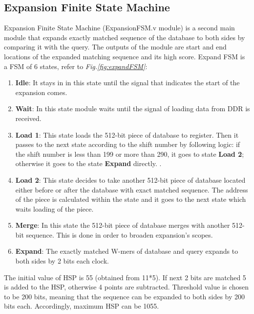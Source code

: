 \subsection{Expansion Finite State Machine}
\quad Expansion Finite State Machine (ExpansionFSM.v module) is a second main module that expands exactly matched sequence of the database to both sides by comparing it with the query. The outputs of the module are start and end locations of the expanded matching sequence and its high score. Expand FSM is a FSM of 6 states, refer to \textit{Fig.\ref{fig:expandFSM}}:

\begin{enumerate}
  \item \textbf{Idle}: It stays in in this state until the signal that indicates the start of the expansion comes.
  \item \textbf{Wait}: In this state module waits until the signal of loading data from DDR is received. 
  \item \textbf{Load 1}: This state loads the 512-bit piece of database to register. Then it passes to the next state according to the shift number by following logic: if the shift number is less than 199 or more than 290, it goes to state \textbf{Load 2}; otherwise it goes to the state \textbf{Expand} directly. . 
  \item \textbf{Load 2}: This state decides to take another 512-bit piece of database located either before or after the database with exact matched sequence. The address of the piece is calculated within the state and it goes to the next state which waits loading of the piece. 
  \item \textbf{Merge}: In this state the 512-bit piece of database merges with another 512-bit sequence. This is done in order to broaden expansion's scopes.
  \item \textbf{Expand}: The exactly matched W-mers of database and query expands to both sides by 2 bits each clock.
\end{enumerate}

The initial value of HSP is 55 (obtained from 11*5). If next 2 bits are matched 5 is added to the HSP, otherwise 4 points are subtracted. Threshold value is chosen to be 200 bits, meaning that the sequence can be expanded to both sides by 200 bits each. Accordingly, maximum HSP can be 1055. 
       

